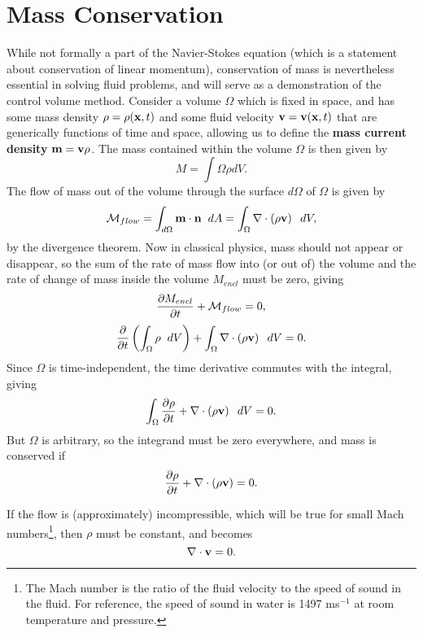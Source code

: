 \section{Mass Conservation}
While not formally a part of the Navier-Stokes equation (which is a statement about conservation of linear momentum), conservation of mass is nevertheless essential in solving fluid problems, and will serve as a demonstration of the control volume method. Consider a volume $\Omega$ which is fixed in space, and has some mass density $\rho = \rho(\mathbf{x},t)$ and some fluid velocity $\mathbf{v} = \mathbf{v}(\mathbf{x} ,t)$ that are generically functions of time and space, allowing us to define the {\bf mass current density} $\mathbf{m} = \mathbf{v}\rho$. The mass contained within the volume $\Omega$ is then given by 
\begin{equation}
M = \int{\Omega}{}{\rho}{dV}.
\end{equation}
The flow of mass out of the volume through the surface $d\Omega$ of $\Omega$ is given by 
\begin{equation}
\mathcal{M}_{flow} = \int{d\Omega}{}{\Vector{m}\cdot\Vector{n}}{dA} = \int{\Omega}{}{\Div{\paren{\rho\Vector{v}}}}{dV},
\end{equation}
by the divergence theorem.  Now in classical physics, mass should not appear or disappear, so the sum of the rate of mass flow into (or out of) the volume and the rate of change of mass inside the volume $M_{encl}$ must be zero, giving
\begin{equation}
\pder{1}{M_{encl}}{t} + \mathcal{M}_{flow} = 0,
\end{equation}
\begin{equation}
\pder{1}{}{t}\paren{\int{\Omega}{}{\rho}{dV}} + \int{\Omega}{}{\Div{\paren{\rho\Vector{v}}}}{dV} =0.
\end{equation}
Since $\Omega$ is time-independent, the time derivative commutes with the integral, giving 
\begin{equation}
\int{\Omega}{}{\pder{1}{\rho}{t} + \Div{\paren{\rho\Vector{v}}}}{dV} = 0.
\end{equation}
But $\Omega$ is arbitrary, so the integrand must be zero everywhere, and mass is conserved if
\begin{equation}\label{eq:consMassFull}
\pder{1}{\rho}{t} + \Div{\paren{\rho\Vector{v}} }= 0.
\end{equation}

If the flow is (approximately) incompressible, which will be true for small Mach numbers\footnote{The Mach number is the ratio of the fluid velocity to the speed of sound in the fluid. For reference, the speed of sound in water is 1497 ms$^{-1}$ at room temperature and pressure.}, then $\rho$ must be constant, and  becomes 
\begin{equation}\label{eq:consMassIncomp}
\nabla\cdot\mathbf{v} = 0.
\end{equation}

